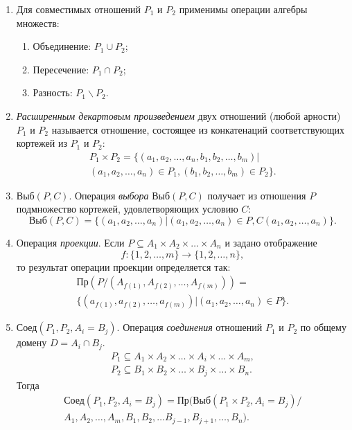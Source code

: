 \begin{enumerate}
    \item Для совместимых отношений $P_1$ и $P_2$ применимы операции алгебры множеств:
    \begin{enumerate}
        \item Объединение: $P_1\cup P_2$;
        \item Пересечение: $P_1\cap P_2$;
        \item Разность: $P_1\backslash P_2$.
    \end{enumerate}
    
    \item \emph{Расширенным декартовым произведением} двух отношений (любой арности) $P_1$ и $P_2$ называется отношение, состоящее из конкатенаций соответствующих кортежей из $P_1$ и $P_2$:
    \[
        \begin{split}
            P_1\times P_2=\{(a_1,a_2,\ldots,a_n,b_1,b_2,\ldots,b_m)|\\
            (a_1,a_2,\ldots,a_n)\in P_1,(b_1,b_2,\ldots,b_m)\in P_2\}.
        \end{split}
    \]
    
    \item $\text{Выб}(P,C)$. Операция \emph{выбора} $\text{Выб}(P,C)$ получает из отношения $P$ подмножество кортежей, удовлетворяющих условию $C$:
    \[
        \text{Выб}(P,C)=\{(a_1,a_2,\ldots,a_n)|(a_1,a_2,\ldots,a_n)\in P,C(a_1,a_2,\ldots,a_n)\}.
    \]
    
    \item Операция \emph{проекции}. Если $P\subseteq A_1\times A_2\times\ldots\times A_n$ и задано отображение 
    \[f:\{1,2,\ldots,m\}\to\{1,2,\ldots,n\},\] 
    то результат операции проекции определяется так:
    \[
        \begin{split}
            \text{Пр}(P/(A_{f(1)},A_{f(2)},\ldots,A_{f(m)}))=\\
            \{(a_{f(1)},a_{f(2)},\ldots,a_{f(m)})|(a_1,a_2,\ldots,a_n)\in P\}.
        \end{split}
    \]
    
    \item $\text{Соед}(P_1,P_2,A_i=B_j)$. Операция \emph{соединения} отношений $P_1$ и $P_2$ по общему домену $D=A_i\cap B_j$.
    \[
        \begin{split}
            P_1\subseteq A_1\times A_2\times\ldots\times A_i\times\ldots\times A_m,\\
            P_2\subseteq B_1\times B_2\times\ldots\times B_j\times\ldots\times B_n.
        \end{split}
    \]
    Тогда
    \[
        \begin{split}
            \text{Соед}(P_1,P_2,A_i=B_j)=\text{Пр}(\text{Выб}(P_1\times P_2, A_i=B_j)/\\
            A_1,A_2,\ldots,A_m,B_1,B_2,\ldots B_{j-1},B_{j+1},\ldots,B_n).
        \end{split}
    \]
    

\end{enumerate}
